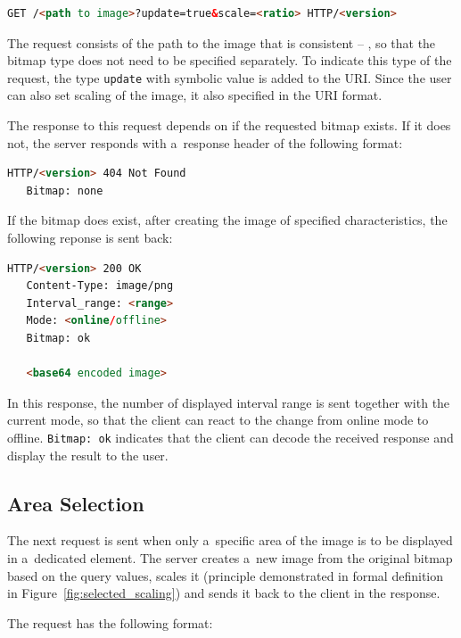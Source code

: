 \begin{lstlisting}[language=HTML,label={lst:update_req}]
   GET /<path to image>?update=true&scale=<ratio> HTTP/<version>
\end{lstlisting}

The request consists of the path to the image that is consistent -- ,
so that the bitmap type does not need to be specified separately.
To indicate this type of the request, the type \texttt{update} with symbolic value is added to the URI.
Since the user can also set scaling of the image, it also specified in the URI format.

The response to this request depends on if the requested bitmap exists. If it does not,
the server responds with a~response header of the following format:

\begin{lstlisting}[language=HTML,label={lst:update_resp_none}]
   HTTP/<version> 404 Not Found
   Bitmap: none
\end{lstlisting}

If the bitmap does exist, after creating the image of specified characteristics,
the following reponse is sent back:

\begin{lstlisting}[language=HTML,label={lst:update_resp_ok}]
   HTTP/<version> 200 OK
   Content-Type: image/png
   Interval_range: <range>
   Mode: <online/offline>
   Bitmap: ok

   <base64 encoded image>
\end{lstlisting}

In this response, the number of displayed interval range is sent together with
the current mode, so that the client can react to the change from online
mode to offline. \texttt{Bitmap: ok} indicates that the client can decode
the received response and display the result to the user. 

\subsection{Area Selection}
The next request is sent when only a~specific area of the image is to be
displayed in a~dedicated element.
The server creates a~new image from the original bitmap based on the query
values, scales it (principle demonstrated in formal definition in Figure~\ref{fig:selected_scaling})
and sends it back to the client in the response.

The request has the following format:

